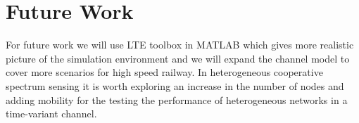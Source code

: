 \section{Future Work}

For future work we will use LTE toolbox in MATLAB which gives more realistic picture of the simulation environment and we will expand the channel model to cover more scenarios for high speed railway. In heterogeneous cooperative spectrum sensing it is worth exploring an increase in the number of nodes and adding mobility for the testing the performance of heterogeneous networks in a time-variant channel.

